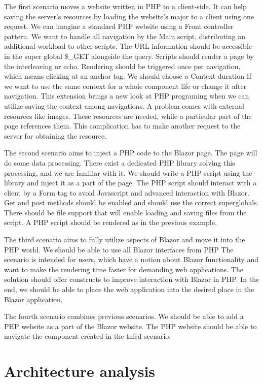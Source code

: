 The first scenario moves a website written in PHP to a client-side.
It can help saving the server's resources by loading the website's major to a client using one request.
We can imagine a standard PHP website using a Front controller pattern.
We want to handle all navigation by the Main script, distributing an additional workload to other scripts.
The URL information should be accessible in the super global \$\_GET alongside the query.
Scripts should render a page by the interleaving or echo.
Rendering should be triggered once per navigation, which means clicking at an anchor tag.
We should choose a Context duration If we want to use the same context for a whole component life or change it after navigation.
This extension brings a new look at PHP programing when we can utilize saving the context among navigations.
A problem comes with external resources like images.
These resources are needed, while a particular part of the page references them.
This complication has to make another request to the server for obtaining the resource.
\par
The second scenario aims to inject a PHP code to the Blazor page.
The page will do some data processing.
There exist a dedicated PHP library solving this processing, and we are familiar with it.
We should write a PHP script using the library and inject it as a part of the page.
The PHP script should interact with a client by a Form tag to avoid Javascript and advanced interaction with Blazor.
Get and post methods should be enabled and should use the correct superglobals.
There should be file support that will enable loading and saving files from the script.
A PHP script should be rendered as in the previous example.
\par
The third scenario aims to fully utilize aspects of Blazor and move it into the PHP world.
We should be able to use all Blazor interfaces from PHP
The scenario is intended for users, which have a notion about Blazor functionality and want to make the rendering time faster for demanding web applications.
The solution should offer constructs to improve interaction with Blazor in PHP.
In the end, we should be able to place the web application into the desired place in the Blazor application.
\par
The fourth scenario combines previous scenarios.
We should be able to add a PHP website as a part of the Blazor website.
The PHP website should be able to navigate the component created in the third scenario.

\section{Architecture analysis}

